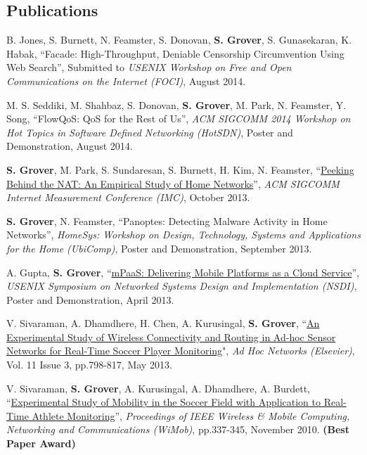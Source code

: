 \documentclass[margin,line]{resume}
\begin{document}
\begin{resume}
    \section{\mysidestyle \normalsize Publications}

    B. Jones, S. Burnett, N. Feamster, S. Donovan, \textbf{S. Grover}, S. Gunasekaran, K. Habak,
    ``Facade: High-Throughput, Deniable Censorship Circumvention Using Web Search'', Submitted to
    \emph{USENIX Workshop on Free and Open Communications on the Internet (FOCI)}, August 2014.

\vspace{-2.5mm}
    M. S. Seddiki, M. Shahbaz, S. Donovan, \textbf{S. Grover}, M. Park, N. Feamster, Y. Song,
    ``FlowQoS: QoS for the Rest of Us'',
    \emph{ACM SIGCOMM 2014 Workshop on Hot Topics in Software Defined Networking (HotSDN)}, Poster and Demonstration, August 2014.

\vspace{-2.5mm}
    \textbf{S. Grover}, M. Park, S. Sundaresan, S. Burnett, H. Kim,
    N. Feamster,
    ``\href{http://dx.doi.org/10.1145/2504730.2504736}
    {Peeking Behind the NAT: An Empirical Study of Home Networks}'',
    \emph{ACM SIGCOMM Internet Measurement Conference (IMC)}, October 2013.

\vspace{-2.5mm}
    \textbf{S. Grover}, N. Feamster,
    ``Panoptes: Detecting Malware Activity in Home Networks'',
    \emph{HomeSys: Workshop on Design, Technology, Systems
    and Applications for the Home (UbiComp)}, Poster and Demonstration,
    September 2013.

\vspace{-2.5mm}
    A. Gupta, \textbf{S. Grover},
    ``\href{https://www.usenix.org/system/files/nsdip13-paper45.pdf}
    {mPaaS: Delivering Mobile Platforms as a Cloud Service}'',
    \emph{USENIX Symposium on Networked Systems Design and Implementation (NSDI)}, Poster and Demonstration, April 2013.

\vspace{-2.5mm}    
    V. Sivaraman, A. Dhamdhere, H. Chen, A. Kurusingal, \textbf{S. Grover},
    ``\href{http://www.sciencedirect.com/science/article/pii/S1570870512001631}
    {An Experimental Study of Wireless Connectivity and Routing in Ad-hoc
    Sensor Networks for Real-Time Soccer Player Monitoring}",
    \emph{Ad Hoc Networks (Elsevier)}, Vol. 11 Issue 3, pp.798-817, May 2013.
    
\vspace{-2.5mm}
    V. Sivaraman, \textbf{S. Grover}, A. Kurusingal, A. Dhamdhere, A. Burdett,
    ``\href{http://dx.doi.org/10.1109/WIMOB.2010.5645046}
    {Experimental Study of Mobility in the Soccer Field with Application
    to Real-Time Athlete Monitoring}'',
    \emph{Proceedings of IEEE Wireless \& Mobile Computing, Networking and
    Communications (WiMob)}, pp.337-345, November 2010.
    \textbf{(Best Paper Award)}


\end{resume}
\end{document}
